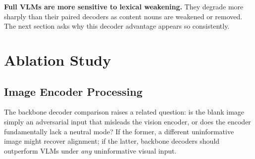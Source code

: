 \documentclass[letterpaper]{article}
\begin{document}
\textbf{Full VLMs are more sensitive to lexical weakening.} They degrade more
sharply than their paired decoders as content nouns are weakened or removed.
The next section asks why this decoder advantage appears so consistently.


\section{Ablation Study}
\label{sec:ablation}

\subsection{Image Encoder Processing}
The backbone decoder comparison raises a related question: is the blank image
simply an adversarial input that misleads the vision encoder, or does the
encoder fundamentally lack a neutral mode? If the former, a different
uninformative image might recover alignment; if the latter, backbone
decoders should outperform VLMs under \emph{any} uninformative visual input.
\end{document}

